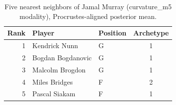 \begin{table}[htbp]
  \centering\small
  \begin{tabular}{rllc}
    \toprule
    Rank & Player & Position & Archetype \\
    \midrule
    1 & Kendrick Nunn & G & 1 \\
    2 & Bogdan Bogdanovic & G & 1 \\
    3 & Malcolm Brogdon & G & 1 \\
    4 & Miles Bridges & F & 2 \\
    5 & Pascal Siakam & F & 1 \\
    \bottomrule
  \end{tabular}
  \caption{Five nearest neighbors of Jamal Murray (curvature_m5 modality), Procrustes-aligned posterior mean.}
  \label{tab:Jamal_Murray_neighbors_curvature_m5}
\end{table}


